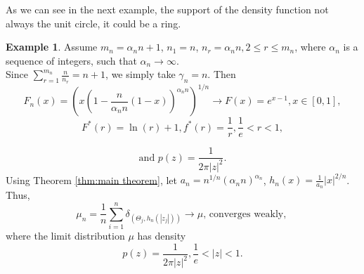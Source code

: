 \documentclass[12pt]{article}
\theoremstyle{plain}
\theoremstyle{definition}
\newtheorem{exm}{\textbf{Example}}
\theoremstyle{remark}
\begin{document}
As we can see in the next example, the support of the density function not always the unit circle, it could be a ring.
\begin{exm}
    Assume $m_n=\alpha_n n+1$, $n_{1}=n$, $n_r=\alpha_n n, 2\leq r \leq m_n$, where $\alpha_n$ is a sequence of integers, such that $\alpha_n\rightarrow \infty$.\\
    Since $\sum_{r=1}^{m_n} \frac{n}{n_{r}}=n+1$, we simply take $\gamma_n=n$. Then
    \begin{equation*}
    F_n(x)=(x(1-\frac{n}{\alpha_n n}(1-x))^{\alpha_n n})^{1/n}\rightarrow F(x)=e^{x-1}, x\in [0,1],
    \end{equation*}
    \begin{equation*}
    F^*(r)=\ln (r)+1, f^*(r)=\frac{1}{r}, \frac{1}{e}<r<1,
    \end{equation*}
\begin{center}
\end{center}
    \begin{equation*}
\text{and  }    p(z)=\frac{1}{2\pi |z|^2}.
    \end{equation*}
    Using Theorem \ref{thm:main theorem}, let $a_{n}=n^{1/n}(\alpha_n n)^{\alpha_n }$, $h_{n}(x)=\frac{1}{a_{n}}|x|^{2 / {n}}$.
    Thus,
    \begin{equation*}
    \mu_{n}=\frac{1}{n} \sum_{i=1}^{n} \delta_{\left(\Theta_{j}, h_{n}\left(\left|z_{j}\right|\right)\right)} \rightarrow \mu  \text {, converges weakly, }
    \end{equation*}
    where the limit distribution $\mu$ has density
    \begin{equation*}
   p(z)=\frac{1}{2\pi |z|^2}, \frac{1}{e}<|z|<1.
    \end{equation*}
\end{exm}
\end{document}
